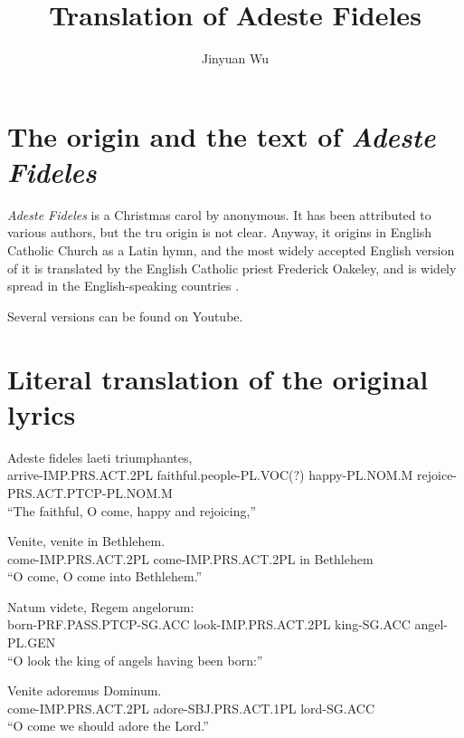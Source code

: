 \documentclass[a4paper]{article}
\title{Translation of Adeste Fideles}
\author{Jinyuan Wu}
\begin{document}
\maketitle

\section{The origin and the text of \emph{Adeste Fideles}}

\emph{Adeste Fideles} is a Christmas carol by anonymous. 
It has been attributed to various authors, but the tru origin is not clear. 
Anyway, it origins in English Catholic Church as a Latin hymn, 
and the most widely accepted English version of it is translated by the English Catholic priest Frederick Oakeley,
and is widely spread in the English-speaking countries \cite{wiki}.

Several versions can be found on Youtube. 

\section{Literal translation of the original lyrics}

\begin{exe}
    
\sn 
\gll Adeste                  fideles                    laeti           triumphantes, \\
     arrive-IMP.PRS.ACT.2PL  faithful.people-PL.VOC(?)  happy-PL.NOM.M  rejoice-PRS.ACT.PTCP-PL.NOM.M \\ 
\glt ``The faithful, O come, happy and rejoicing,''

\sn
\gll Venite,              venite                in Bethlehem. \\
     come-IMP.PRS.ACT.2PL  come-IMP.PRS.ACT.2PL in Bethlehem \\
\glt ``O come, O come into Bethlehem.''

\sn
\gll Natum                     videte,              Regem         angelorum: \\
    born-PRF.PASS.PTCP-SG.ACC  look-IMP.PRS.ACT.2PL king-SG.ACC   angel-PL.GEN  \\
\glt ``O look the king of angels having been born:''

\sn
\gll Venite                adoremus               Dominum. \\
     come-IMP.PRS.ACT.2PL  adore-SBJ.PRS.ACT.1PL  lord-SG.ACC \\
\glt ``O come we should adore the Lord.''

\end{exe}
\end{document}
